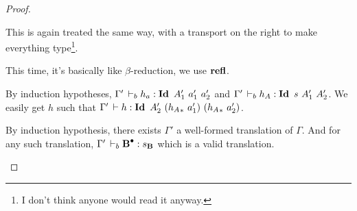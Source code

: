 \documentclass[a4paper,english]{lipics-utf8x}
\begin{document}
\begin{proof}
\begin{caselist}
      \begin{graycase}
        \begin{mathc}
        \end{mathc}
        This is again treated the same way, with a transport on the right to
        make everything
        type\footnote{I don't think anyone would read it anyway.}.
      \end{graycase}

      \begin{graycase}
        \begin{mathc}
        \end{mathc}
        This time, it's basically like $\beta$-reduction, we use $\operatorname{\mathbf{refl}}$.
      \end{graycase}

      \begin{graycase}
        \begin{mathc}
        \end{mathc}
        By induction hypotheses, $\Gamma' \,\vdash_b h_a : \operatorname{\mathbf{Id}~} A'_1\ a'_1\ a'_2$
        and $\Gamma' \,\vdash_b h_A : \operatorname{\mathbf{Id}~} s\ A'_1\ A'_2$.
        We easily get $h$ such that $\Gamma' \der h : \Id A'_2\ %
        ({h_A}_*\ a'_1)\ ({h_A}_*\ a'_2)$.
      \end{graycase}

      \nextcase
      \begin{mathc}
        \ru{\derr \Gamma
          }{\Gamma \derr \mR : \sB}
      \end{mathc}
      By induction hypothesis, there exists $\Gamma'$ a well-formed translation
      of $\Gamma$. And for any such translation, $\Gamma' \,\vdash_b \operatorname{\operatorname{\mathbf{B}}^\bullet} : s_{\operatorname{\mathbf{B}}}$
      which is a valid translation.


\end{caselist}
\end{proof}
\end{document}
